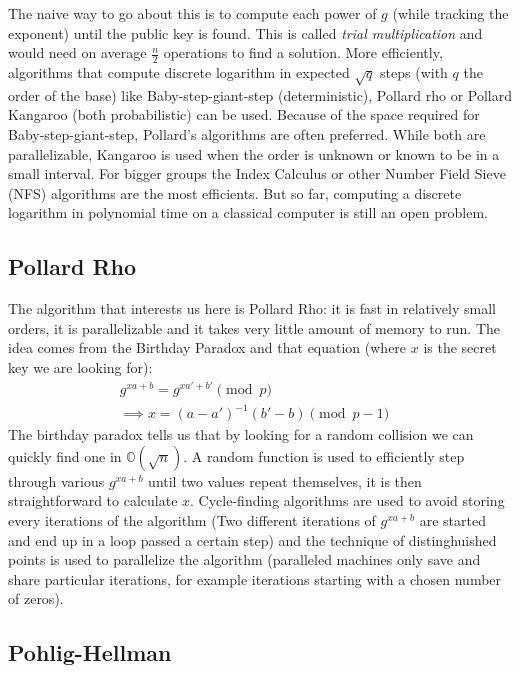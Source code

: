 \documentclass[a4paper,11pt,twocolumn]{article}
\begin{document}
The naive way to go about this is to compute each power of $g$ (while tracking the exponent) until the public key is found. This is called \emph{trial multiplication} and would need on average $\frac{n}{2}$ operations to find a solution.
More efficiently, algorithms that compute discrete logarithm in expected $\sqrt{q}$ steps (with $q$ the order of the base) like Baby-step-giant-step (deterministic), Pollard rho or Pollard Kangaroo (both probabilistic) can be used. Because of the space required for Baby-step-giant-step, Pollard's algorithms are often preferred. While both are parallelizable, Kangaroo is used when the order is unknown or known to be in a small interval. For bigger groups the Index Calculus or other Number Field Sieve (NFS) algorithms are the most efficients. But so far, computing a discrete logarithm in polynomial time on a classical computer is still an open problem.\\

\subsection{Pollard Rho}

The algorithm that interests us here is Pollard Rho: it is fast in relatively small orders, it is parallelizable and it takes very little amount of memory to run. The idea comes from the Birthday Paradox and that equation (where $x$ is the secret key we are looking for):
\begin{align*}
  g^{xa +b } = g^{xa' + b'} \pmod{p}&\\
  \implies x = (a-a')^{-1} (b' - b) \pmod{p-1}&
\end{align*}
The birthday paradox tells us that by looking for a random collision we can quickly find one in $\mathbb{O}(\sqrt{n})$. A random function is used to efficiently step through various $g^{xa + b}$ until two values repeat themselves, it is then straightforward to calculate $x$. Cycle-finding algorithms are used to avoid storing every iterations of the algorithm (Two different iterations of $g^{xa+b}$ are started and end up in a loop passed a certain step) and the technique of distinghuished points is used to parallelize the algorithm (paralleled machines only save and share particular iterations, for example iterations starting with a chosen number of zeros).

\subsection{Pohlig-Hellman}
\end{document}
